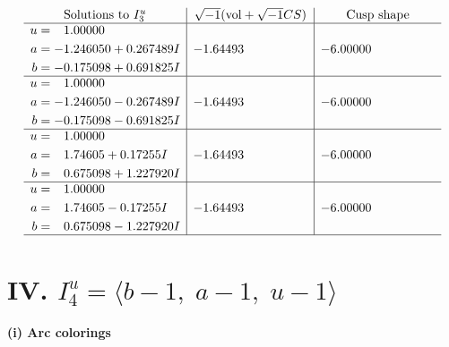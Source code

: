 \documentclass[1p]{elsarticle_modified}
\theoremstyle{definition}
\newcommand{\I}{\sqrt{-1}}
\begin{document}
$$\begin{array}{c|c|c}  
\text{Solutions to }I^u_{3}& \I (\text{vol} + \sqrt{-1}CS) & \text{Cusp shape}\\
 \hline 
\begin{aligned}
u &= \phantom{-}1.00000\phantom{ +0.000000I} \\
a &= -1.246050 + 0.267489 I \\
b &= -0.175098 + 0.691825 I\end{aligned}
 & -1.64493\phantom{ +0.000000I} & -6.00000\phantom{ +0.000000I} \\ \hline\begin{aligned}
u &= \phantom{-}1.00000\phantom{ +0.000000I} \\
a &= -1.246050 - 0.267489 I \\
b &= -0.175098 - 0.691825 I\end{aligned}
 & -1.64493\phantom{ +0.000000I} & -6.00000\phantom{ +0.000000I} \\ \hline\begin{aligned}
u &= \phantom{-}1.00000\phantom{ +0.000000I} \\
a &= \phantom{-}1.74605 + 0.17255 I \\
b &= \phantom{-}0.675098 + 1.227920 I\end{aligned}
 & -1.64493\phantom{ +0.000000I} & -6.00000\phantom{ +0.000000I} \\ \hline\begin{aligned}
u &= \phantom{-}1.00000\phantom{ +0.000000I} \\
a &= \phantom{-}1.74605 - 0.17255 I \\
b &= \phantom{-}0.675098 - 1.227920 I\end{aligned}
 & -1.64493\phantom{ +0.000000I} & -6.00000\phantom{ +0.000000I}\\
 \hline 
 \end{array}$$\newpage\newpage\renewcommand{\arraystretch}{1}
\centering \section*{IV. $I^u_{4}= \langle b-1,\;a-1,\;u-1 \rangle$}
\flushleft \textbf{(i) Arc colorings}\\
\end{document}
